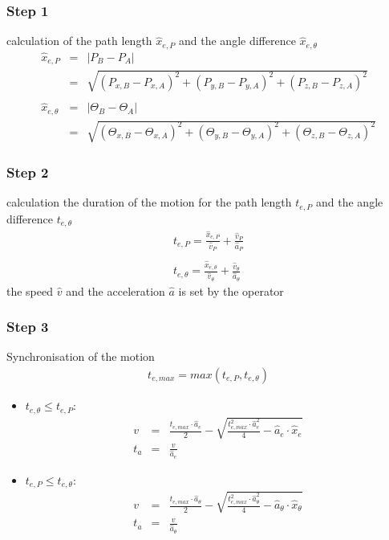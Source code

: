 \documentclass[professionalfonts, 
               xcolor={ usenames, %
                        dvipsnames,%
                        svgnames,%
                        table,%
                        hyperref%
                      }
              ]{beamer}
\begin{document}
\subsubsection{Step 1}
\begin{frame}
calculation of the path length $\hat{x}_{e,P}$ and the angle difference $\hat{x}_{e,\theta}$
\begin{eqnarray*}
\hat{x}_{e,P} & = & \left|P_{B} - P_{A}\right|\\
          & = & \sqrt{(P_{x,B} - P_{x,A})^2 + (P_{y,B} - P_{y,A})^2 + (P_{z,B} - P_{z,A})^2 }\\
\\
\hat{x}_{e,\theta} & = & \left|\Theta_{B} - \Theta_{A}\right|\\
               & = & \sqrt{(\Theta_{x,B} - \Theta_{x,A})^2 + (\Theta_{y,B} - \Theta_{y,A})^2 + (\Theta_{z,B} - \Theta_{z,A})^2 }
\end{eqnarray*}
\end{frame}

\subsubsection{Step 2}
\begin{frame}
calculation the duration of the motion for the path length $t_{e,P}$ and the angle difference $t_{e,\theta}$
\begin{eqnarray*}
t_{e,P} = \frac{\hat{x}_{e,P}}{\hat{v}_{P}}+\frac{\hat{v}_{P}}{\hat{a}_{P}} \\
\\
t_{e,\theta} = \frac{\hat{x}_{e,\theta}}{\hat{v}_{\theta}}+\frac{\hat{v}_{\theta}}{\hat{a}_{\theta}}
\end{eqnarray*}
the speed $\hat{v}$ and the acceleration $\hat{a}$ is set by the operator
\end{frame}

\subsubsection{Step 3}
\begin{frame}
Synchronisation of the motion
\begin{eqnarray*}
t_{e, max} = max\left(t_{e,P}, t_{e,\theta}\right)
\end{eqnarray*}
\begin{itemize}
\item $t_{e,\theta} \le t_{e,P}$:
\begin{eqnarray*}
v & = & \frac{t_{e,max} \cdot \hat{a}_{e}}{2}-\sqrt{\frac{t_{e,max}^2 \cdot \hat{a}_{e}^2}{4}-\hat{a}_{e}\cdot \hat{x}_{e}} \\
t_{a} & = & \frac{v}{\hat{a}_{e}}
\end{eqnarray*}
\item $t_{e,P} \leq t_{e,\theta}$:
\begin{eqnarray*}
v & = & \frac{t_{e,max} \cdot \hat{a}_{\theta}}{2}-\sqrt{\frac{t_{e,max}^2 \cdot \hat{a}_{\theta}^2}{4}-\hat{a}_{\theta}\cdot \hat{x}_{\theta}} \\
t_{a} & = & \frac{v }{\hat{a}_{\theta}}
\end{eqnarray*}
\end{itemize}
\end{frame}
\end{document}
